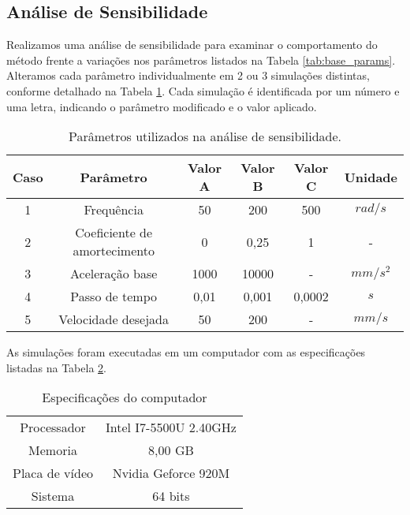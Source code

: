 \subsection{Análise de Sensibilidade}

Realizamos uma análise de sensibilidade para examinar o comportamento do método frente a variações nos parâmetros listados na Tabela \ref{tab:base_params}. Alteramos cada parâmetro individualmente em 2 ou 3 simulações distintas, conforme detalhado na Tabela \ref{tab:sim_params}. Cada simulação é identificada por um número e uma letra, indicando o parâmetro modificado e o valor aplicado.

\begin{table}
    \begin{center}
    \caption{Parâmetros utilizados na análise de sensibilidade.}
    \label{tab:sim_params}
    \begin{tabular}{c c c c c c}
        Caso & Parâmetro & Valor A & Valor B & Valor C & Unidade\\ \hline
        1 & Frequência & 50 & 200 & 500 & $rad/s$\\
        2 & Coeficiente de amortecimento & 0 & 0,25 & 1 & - \\
        3 & Aceleração base & 1000 & 10000 & - & $mm/s^2$ \\
        4 & Passo de tempo & 0,01 & 0,001 & 0,0002 & $s$ \\
        5 & Velocidade desejada & 50 & 200 & - & $mm/s$ \\ \hline
    \end{tabular}
    \end{center}
\end{table}

As simulações foram executadas em um computador com as especificações listadas na Tabela \ref{tab:note_config}.

\begin{table}
    \begin{center}
    \caption{Especificações do computador}
    \label{tab:note_config}
    \begin{tabular}{c c}
        \hline
        Processador & Intel I7-5500U 2.40GHz \\
        Memoria & 8,00 GB \\
        Placa de vídeo & Nvidia Geforce 920M \\
        Sistema & 64 bits \\ \hline
    \end{tabular}
    \end{center}
\end{table}
